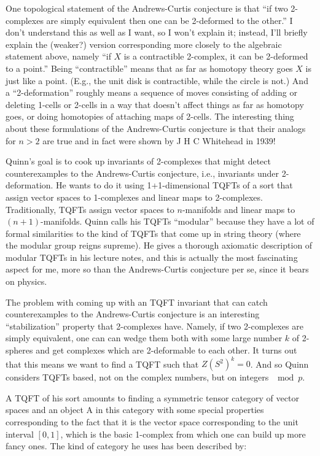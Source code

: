 \documentclass{article}
\begin{document}
One topological statement of the Andrews-Curtis conjecture is that ``if
two 2-complexes are simply equivalent then one can be 2-deformed to the
other.'' I don't understand this as well as I want, so I won't explain
it; instead, I'll briefly explain the (weaker?) version corresponding
more closely to the algebraic statement above, namely ``if \(X\) is a
contractible 2-complex, it can be 2-deformed to a point.'' Being
``contractible'' means that as far as homotopy theory goes \(X\) is just
like a point. (E.g., the unit disk is contractible, while the circle is
not.) And a ``2-deformation'' roughly means a sequence of moves
consisting of adding or deleting 1-cells or 2-cells in a way that
doesn't affect things as far as homotopy goes, or doing homotopies of
attaching maps of 2-cells. The interesting thing about these
formulations of the Andrews-Curtis conjecture is that their analogs for
\(n > 2\) are true and in fact were shown by J H C Whitehead in 1939!

Quinn's goal is to cook up invariants of 2-complexes that might detect
counterexamples to the Andrews-Curtis conjecture, i.e., invariants under
2-deformation. He wants to do it using 1+1-dimensional TQFTs of a sort
that assign vector spaces to 1-complexes and linear maps to 2-complexes.
Traditionally, TQFTs assign vector spaces to \(n\)-manifolds and linear
maps to \((n+1)\)-manifolds. Quinn calls his TQFTs ``modular'' because
they have a lot of formal similarities to the kind of TQFTs that come up
in string theory (where the modular group reigns supreme). He gives a
thorough axiomatic description of modular TQFTs in his lecture notes,
and this is actually the most fascinating aspect for me, more so than
the Andrews-Curtis conjecture per se, since it bears on physics.

The problem with coming up with an TQFT invariant that can catch
counterexamples to the Andrews-Curtis conjecture is an interesting
``stabilization'' property that 2-complexes have. Namely, if two
2-complexes are simply equivalent, one can can wedge them both with some
large number \(k\) of 2-spheres and get complexes which are 2-deformable
to each other. It turns out that this means we want to find a TQFT such
that \(Z(S^2)^k = 0\). And so Quinn considers TQFTs based, not on the
complex numbers, but on integers \(\mod p\).

A TQFT of his sort amounts to finding a symmetric tensor category of
vector spaces and an object A in this category with some special
properties corresponding to the fact that it is the vector space
corresponding to the unit interval \([0,1]\), which is the basic
1-complex from which one can build up more fancy ones. The kind of
category he uses has been described by:
\end{document}
